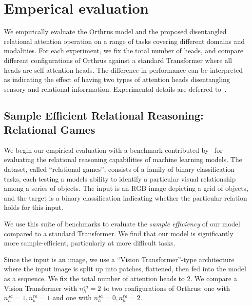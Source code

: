 \section{Emperical evaluation}\label{sec:experiments}

We empirically evaluate the Orthrus model and the proposed disentangled relational attention operation on a range of tasks covering different domains and modalities. For each experiment, we fix the total number of heads, and compare different configurations of Orthrus against a standard Transformer where all heads are self-attention heads. The difference in performance can be interpreted as indicating the effect of having two types of attention heads disentangling sensory and relational inforrmation. Experimental details are deferred to~.

\subsection{Sample Efficient Relational Reasoning: Relational Games}\label{ssec:relgames}

We begin our empirical evaluation with a benchmark contributed by~\citet{shanahanExplicitlyRelationalNeurala} for evaluating the relational reasoning capabilities of machine learning models. The dataset, called ``relational games'', consists of a family of binary classification tasks, each testing a models ability to identify a particular visual relationship among a series of objects. The input is an RGB image depicting a grid of objects, and the target is a binary classification indicating whether the particular relation holds for this input.


We use this suite of benchmarks to evaluate the \textit{sample efficiency} of our model compared to a standard Transformer. We find that our model is significantly more sample-efficient, particularly at more difficult tasks. %

Since the input is an image, we use a ``Vision Transformer''-type architecture~\citep{dosovitskiyImageWorth16x162020} where the input image is split up into patches, flattened, then fed into the model as a sequence. We fix the total number of attention heads to 2. We compare a Vision Transformer with $n_h^{sa} = 2$ to two configurations of Orthrus: one with $n_h^{sa} = 1, n_h^{ra} = 1$ and one with $n_h^{sa} = 0, n_h^{ra} = 2$.

